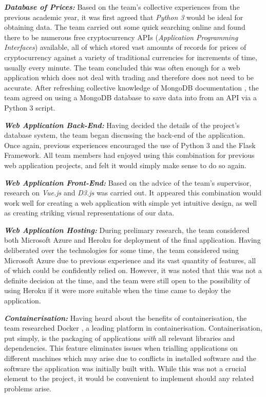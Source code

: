 \textbf{\textit{Database of Prices:}} Based on the team's collective experiences from the previous academic year, it was first agreed that \textit{Python 3} would be ideal for obtaining data. The team carried out some quick searching online and found there to be numerous free cryptocurrency APIs (\textit{Application Programming Interfaces}) available, all of which stored vast amounts of records for prices of cryptocurrency against a variety of traditional currencies for increments of time, usually every minute. The team concluded this was often enough for a web application which does not deal with trading and therefore does not need to be accurate. After refreshing collective knowledge of MongoDB documentation \cite{mdbdocs}, the team agreed on using a MongoDB database to save data into from an API via a Python 3 script.

\textbf{\textit{Web Application Back-End:}} Having decided the details of the project's database system, the team began discussing the back-end of the application. Once again, previous experiences encouraged the use of Python 3 and the Flask Framework. All team members had enjoyed using this combination for previous web application projects, and felt it would simply make sense to do so again.

\textbf{\textit{Web Application Front-End:}} Based on the advice of the team's supervisor, research on \textit{Vue.js} \cite{vuejs} and \textit{D3.js} \cite{d3js} was carried out. It appeared this combination would work well for creating a web application with simple yet intuitive design, as well as creating striking visual representations of our data.

\textbf{\textit{Web Application Hosting:}} During prelimary research, the team considered both Microsoft Azure \cite{azure} and Heroku \cite{heroku} for deployment of the final application. Having deliberated over the technologies for some time, the team considered using Microsoft Azure due to previous experience and its vast quantity of features, all of which could be confidently relied on. However, it was noted that this was not a definite decision at the time, and the team were still open to the possibility of using Heroku if it were more suitable when the time came to deploy the application.

\textbf{\textit{Containerisation:}} Having heard about the benefits of containerisation, the team researched Docker \cite{docker}, a leading platform in containerisation. Containerisation, put simply, is the packaging of applications \textit{with} all relevant libraries and dependencies. This feature eliminates issues when trialling applications on different machines which may arise due to conflicts in installed software and the software the application was initially built with. While this was not a crucial element to the project, it would be convenient to implement should any related problems arise.

